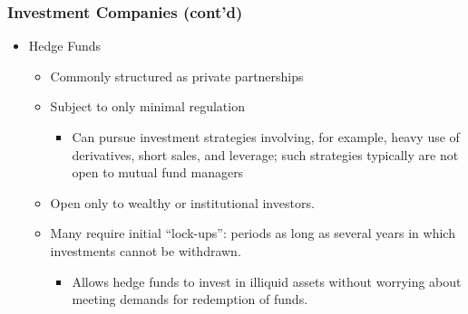 \documentclass[10pt]{beamer}
\begin{document}
	
	
	
	
	\begin{frame}
		\frametitle{Investment Companies (cont'd)}
		
		\begin{itemize} 
			\item Hedge Funds
			
			\begin{itemize}
				\item Commonly structured as private partnerships
				\item Subject to only minimal regulation
				\begin{itemize}
					\item Can pursue investment strategies involving, for example, heavy use of derivatives, short sales, and leverage; such strategies typically are not open to mutual fund managers
				\end{itemize}
				
				\item Open only to wealthy or institutional investors. \item Many require initial ``lock-ups'': periods as long as several years in which investments cannot be withdrawn. 
				
				\begin{itemize}
					\item Allows hedge funds to invest in illiquid
					assets without worrying about meeting demands for redemption of funds. 
				\end{itemize}
				
			\end{itemize}
			
		\end{itemize}
		
	\end{frame}
	
	
	
	
\end{document}
